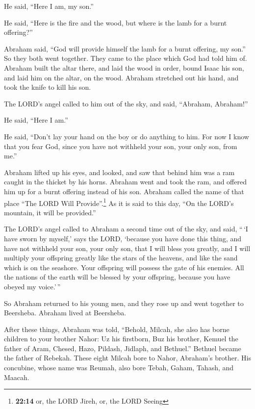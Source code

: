 He said, ``Here I am, my son.''

He said, ``Here is the fire and the wood, but where is the lamb for a
burnt offering?''

 Abraham said, ``God will provide himself the lamb for a
burnt offering, my son.'' So they both went together. 
They came to the place which God had told him of. Abraham built the
altar there, and laid the wood in order, bound Isaac his son, and laid
him on the altar, on the wood.  Abraham stretched out his
hand, and took the knife to kill his son.

 The LORD's angel called to him out of the sky, and said,
``Abraham, Abraham!''

He said, ``Here I am.''

 He said, ``Don't lay your hand on the boy or do anything
to him. For now I know that you fear God, since you have not withheld
your son, your only son, from me.''

 Abraham lifted up his eyes, and looked, and saw that
behind him was a ram caught in the thicket by his horns. Abraham went
and took the ram, and offered him up for a burnt offering instead of his
son.  Abraham called the name of that place ``The LORD
Will Provide''.\footnote{\textbf{22:14} or, the LORD Jireh, or, the LORD
  Seeing} As it is said to this day, ``On the LORD's mountain, it will
be provided.''

 The LORD's angel called to Abraham a second time out of
the sky,  and said, ``\,`I have sworn by myself,' says
the LORD, `because you have done this thing, and have not withheld your
son, your only son,  that I will bless you greatly, and I
will multiply your offspring greatly like the stars of the heavens, and
like the sand which is on the seashore. Your offspring will possess the
gate of his enemies.  All the nations of the earth will
be blessed by your offspring, because you have obeyed my voice.'\,''

 So Abraham returned to his young men, and they rose up
and went together to Beersheba. Abraham lived at Beersheba.

 After these things, Abraham was told, ``Behold, Milcah,
she also has borne children to your brother Nahor:  Uz
his firstborn, Buz his brother, Kemuel the father of Aram,
 Chesed, Hazo, Pildash, Jidlaph, and Bethuel.''
 Bethuel became the father of Rebekah. These eight Milcah
bore to Nahor, Abraham's brother.  His concubine, whose
name was Reumah, also bore Tebah, Gaham, Tahash, and Maacah.

